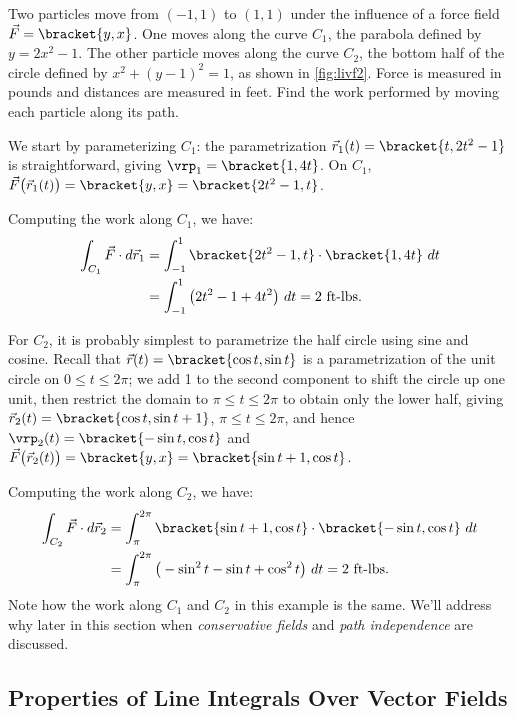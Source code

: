 {Two particles move from $(-1,1)$ to $(1,1)$ under the influence of a force field $\vec F =\bracket{y,x}$. One moves along the curve $C_1$, the parabola defined by $y = 2x^2-1$. The other particle moves along the curve $C_2$, the bottom half of the circle defined by $x^2+(y-1)^2=1$, as shown in \autoref{fig:livf2}. Force is measured in pounds and distances are measured in feet. Find the work performed by moving each particle along its path.}
{We start by parameterizing $C_1$: the parametrization $\vec r_1(t) =\bracket{t,2t^2-1}$ is straightforward, giving $\vrp_1 =\bracket{1,4t}$. On $C_1$, $\vec F\big(\vec r_1(t)\big) =\bracket{y,x}=\bracket{2t^2-1,t}$.

Computing the work along $C_1$, we have:
\begin{align*}
	\int_{C_1} \vec F\cdot d\vec r_1
	& = \int_{-1}^1\bracket{2t^2-1,t}\cdot\bracket{1,4t}\ dt \\
	&= \int_{-1}^1 \big(2t^2-1+4t^2\big)\ dt = 2 \text{ ft-lbs}.
\end{align*}

For $C_2$, it is probably simplest to parametrize the half circle using sine and cosine. Recall that $\vec r(t) =\bracket{\cos t,\sin t}$ is a parametrization of the unit circle on $0\leq t\leq 2\pi$; we add 1 to the second component to shift the circle up one unit, then restrict the domain to $\pi\leq t\leq 2\pi$  to obtain only the lower half, giving $\vec r_2(t) =\bracket{\cos t,\sin t+1}$, $\pi\leq t\leq 2\pi$, and hence $\vrp_2(t) =\bracket{-\sin t,\cos t}$ and $\vec F\big(\vec r_2(t)\big) =\bracket{y,x}=\bracket{\sin t+1,\cos t}$.

Computing the work along $C_2$, we have:
\begin{align*}
	\int_{C_2} \vec F\cdot d\vec r_2
	& = \int_{\pi}^{2\pi}\bracket{\sin t+1,\cos t}\cdot\bracket{-\sin t,\cos t}\ dt \\
	&= \int_{\pi}^{2\pi} \big(-\sin^2t-\sin t+\cos^2t\big)\ dt = 2 \text{ ft-lbs}.
\end{align*}
Note how the work along $C_1$ and $C_2$ in this example is the same. We'll address why later in this section when \emph{conservative fields} and \emph{path independence} are discussed.}

\subsection{Properties of Line Integrals Over Vector Fields}

